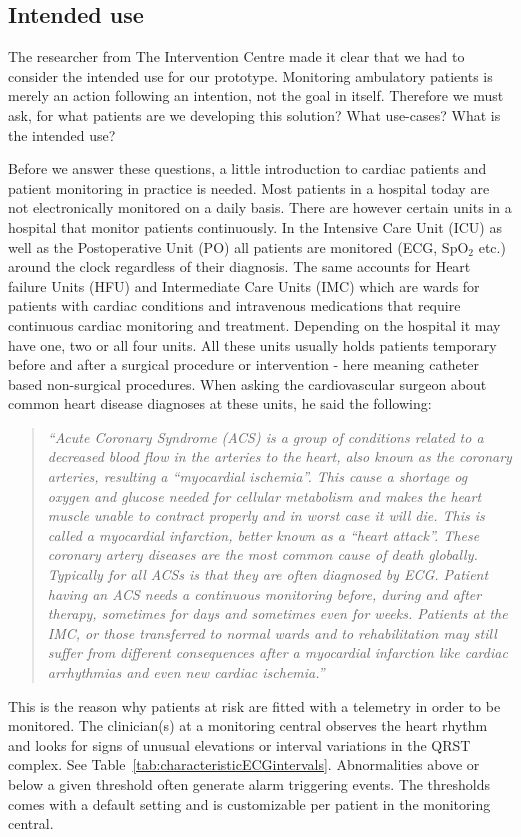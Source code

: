 \subsection{Intended use} %
\label{sub:intended_use}

The researcher from The Intervention Centre made it clear that we had to consider the intended use for our prototype. Monitoring ambulatory patients is merely an action following an intention, not the goal in itself. Therefore we must ask, for what patients are we developing this solution? What use-cases? What is the intended use?

Before we answer these questions, a little introduction to cardiac patients and patient monitoring in practice is needed. Most patients in a hospital today are not electronically monitored on a daily basis. There are however certain units in a hospital that monitor patients continuously. In the Intensive Care Unit (ICU) as well as the Postoperative Unit (PO) all patients are monitored (ECG, SpO$_2$ etc.) around the clock regardless of their diagnosis. The same accounts for Heart failure Units (HFU) and Intermediate Care Units (IMC) which are wards for patients with cardiac conditions and intravenous medications that require continuous cardiac monitoring and treatment. Depending on the hospital it may have one, two or all four units. All these units usually holds patients temporary before and after a surgical procedure or intervention - here meaning catheter based non-surgical procedures. When asking the cardiovascular surgeon about common heart disease diagnoses at these units, he said the following: 

\begin{quote} 
\textit{``Acute Coronary Syndrome (ACS) is a group of conditions related to a decreased blood flow in the arteries to the heart, also known as the coronary arteries, resulting a “myocardial ischemia”. This cause a shortage og oxygen and glucose needed for cellular metabolism and makes the heart muscle unable to contract properly and in worst case it will die. This is called a myocardial infarction, better known as a “heart attack”. These coronary artery diseases are the most common cause of death globally. Typically for all ACSs is that they are often diagnosed by ECG. Patient having an ACS needs a continuous monitoring before, during and after therapy, sometimes for days and sometimes even for weeks. Patients at the IMC, or those transferred to normal wards and to rehabilitation may still suffer from different consequences after a myocardial infarction like cardiac arrhythmias and even new cardiac ischemia.''}
\end{quote}
\noindent
This is the reason why patients at risk are fitted with a telemetry in order to be monitored. The clinician(s) at a monitoring central observes the heart rhythm and looks for signs of unusual elevations or interval variations in the QRST complex. See Table~\ref{tab:characteristicECGintervals}. Abnormalities above or below a given threshold often generate alarm triggering events. The thresholds comes with a default setting and is customizable per patient in the monitoring central. 

